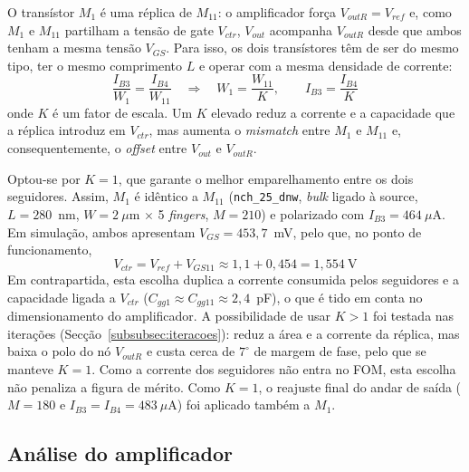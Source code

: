 O transístor $M_1$ é uma réplica de $M_{11}$: o amplificador força $V_{outR} = V_{ref}$ e, como $M_1$ e $M_{11}$ partilham a tensão de gate
$V_{ctr}$, $V_{out}$ acompanha $V_{outR}$ desde que ambos tenham a mesma tensão $V_{GS}$. Para isso, os dois transístores têm de ser do mesmo
tipo, ter o mesmo comprimento $L$ e operar com a mesma densidade de corrente:
\begin{equation}
    \frac{I_{B3}}{W_1} = \frac{I_{B4}}{W_{11}} \quad\Rightarrow\quad W_1 = \frac{W_{11}}{K}, \qquad I_{B3} = \frac{I_{B4}}{K}
\end{equation}
onde $K$ é um fator de escala. Um $K$ elevado reduz a corrente e a capacidade que a réplica introduz em $V_{ctr}$, mas aumenta o \textit{mismatch}
entre $M_1$ e $M_{11}$ e, consequentemente, o \textit{offset} entre $V_{out}$ e $V_{outR}$.

Optou-se por $K = 1$, que garante o melhor emparelhamento entre os dois seguidores. Assim, $M_1$ é idêntico a $M_{11}$ (\texttt{nch\_25\_dnw}, \textit{bulk} ligado à source,
$L = 280$~nm, $W = 2~\mu$m $\times$ 5 \textit{fingers}, $M = 210$) e polarizado com $I_{B3} = 464~\mu$A.
Em simulação, ambos apresentam $V_{GS} = 453{,}7$~mV, pelo que, no ponto de funcionamento,
\begin{equation}
    V_{ctr} = V_{ref} + V_{GS11} \approx 1{,}1 + 0{,}454 = 1{,}554~\text{V}
\end{equation}
Em contrapartida, esta escolha duplica a corrente consumida pelos seguidores e a capacidade ligada a
$V_{ctr}$ ($C_{gg1} \approx C_{gg11} \approx 2{,}4$~pF), o que é tido em conta no dimensionamento do amplificador.
A possibilidade de usar $K > 1$ foi testada nas iterações (Secção~\ref{subsubsec:iteracoes}): reduz a área e a corrente
da réplica, mas baixa o polo do nó $V_{outR}$ e custa cerca de $7^\circ$ de margem de fase, pelo que se manteve $K = 1$.
Como a corrente dos seguidores não entra no FOM, esta escolha não penaliza a figura de mérito.
Como $K = 1$, o reajuste final do andar de saída ($M = 180$ e $I_{B3} = I_{B4} = 483~\mu$A) foi aplicado também a $M_1$.


\subsection{Análise do amplificador}
\label{subsec:analise_amp}

